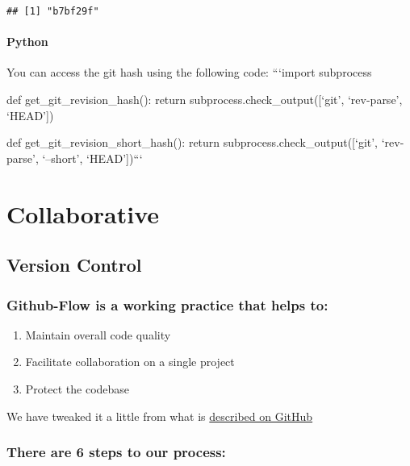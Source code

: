 \documentclass[]{book}
\providecommand{\tightlist}{%
  \setlength{\itemsep}{0pt}\setlength{\parskip}{0pt}}
\let\oldparagraph\paragraph
\renewcommand{\paragraph}[1]{\oldparagraph{#1}\mbox{}}
\begin{document}
\begin{verbatim}
## [1] "b7bf29f"
\end{verbatim}

\hypertarget{python}{%
\paragraph{Python}\label{python}}

You can access the git hash using the following code:
```import subprocess

def get\_git\_revision\_hash():
return subprocess.check\_output({[}`git', `rev-parse', `HEAD'{]})

def get\_git\_revision\_short\_hash():
return subprocess.check\_output({[}`git', `rev-parse', `--short', `HEAD'{]})```

\hypertarget{collaborate}{%
\section{Collaborative}\label{collaborate}}

\hypertarget{versioncontrol}{%
\subsection{Version Control}\label{versioncontrol}}

\hypertarget{github-flow-is-a-working-practice-that-helps-to}{%
\subsubsection*{Github-Flow is a working practice that helps to:}\label{github-flow-is-a-working-practice-that-helps-to}}

\begin{enumerate}
\def\labelenumi{\arabic{enumi}.}
\tightlist
\item
  Maintain overall code quality\\
\item
  Facilitate collaboration on a single project\\
\item
  Protect the codebase
\end{enumerate}

We have tweaked it a little from what is \href{https://guides.github.com/introduction/flow/}{described on GitHub}

\hypertarget{there-are-6-steps-to-our-process}{%
\subsubsection*{There are 6 steps to our process:}\label{there-are-6-steps-to-our-process}}
\end{document}
